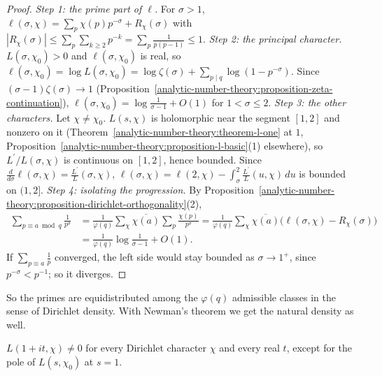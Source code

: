 \begin{proof}
\emph{Step 1: the prime part of $\ell$.} For $\sigma > 1$, $\ell(\sigma, \chi) = \sum_p\chi(p)p^{-\sigma} + R_\chi(\sigma)$ with $|R_\chi(\sigma)| \leq \sum_p\sum_{k \geq 2}p^{-k} = \sum_p\frac{1}{p(p - 1)} \leq 1$.
\emph{Step 2: the principal character.} $L(\sigma, \chi_0) > 0$ and $\ell(\sigma, \chi_0)$ is real, so $\ell(\sigma, \chi_0) = \log L(\sigma, \chi_0) = \log\zeta(\sigma) + \sum_{p \mid q}\log(1 - p^{-\sigma})$. Since
$(\sigma - 1)\zeta(\sigma) \to 1$ (Proposition~\ref{analytic-number-theory:proposition-zeta-continuation}), $\ell(\sigma, \chi_0) = \log\frac{1}{\sigma - 1} + O(1)$ for $1 < \sigma \leq 2$.
\emph{Step 3: the other characters.} Let $\chi \neq \chi_0$. $L(s, \chi)$ is holomorphic near the segment $[1, 2]$ and nonzero on it (Theorem~\ref{analytic-number-theory:theorem-l-one} at $1$,
Proposition~\ref{analytic-number-theory:proposition-l-basic}(1) elsewhere), so $L^{\prime}/L(\sigma, \chi)$ is continuous on $[1, 2]$, hence bounded. Since $\frac{d}{d\sigma}\ell(\sigma, \chi) = \frac{L^{\prime}}{L}(\sigma, \chi)$,
$\ell(\sigma, \chi) = \ell(2, \chi) - \int_\sigma^2\frac{L^{\prime}}{L}(u, \chi)\,du$ is bounded on $(1, 2]$.
\emph{Step 4: isolating the progression.} By Proposition~\ref{analytic-number-theory:proposition-dirichlet-orthogonality}(2),
\[
\begin{aligned}
\sum_{p \equiv a \bmod q}\frac{1}{p^\sigma} &= \frac{1}{\varphi(q)}\sum_\chi\overline{\chi(a)}\sum_p\frac{\chi(p)}{p^\sigma} = \frac{1}{\varphi(q)}\sum_\chi\overline{\chi(a)}\bigl(\ell(\sigma, \chi) - R_\chi(\sigma)\bigr) \\
&= \frac{1}{\varphi(q)}\log\frac{1}{\sigma - 1} + O(1).
\end{aligned}
\]
If $\sum_{p \equiv a}\frac1p$ converged, the left side would stay bounded as $\sigma \to 1^+$, since $p^{-\sigma} < p^{-1}$; so it diverges.
\end{proof}

So the primes are equidistributed among the $\varphi(q)$ admissible classes in the sense of Dirichlet density. With Newman's theorem we get the natural density as well.

\begin{proposition}\label{analytic-number-theory:proposition-l-line}
$L(1 + it, \chi) \neq 0$ for every Dirichlet character $\chi$ and every real $t$, except for the pole of $L(s, \chi_0)$ at $s = 1$.
\end{proposition}

